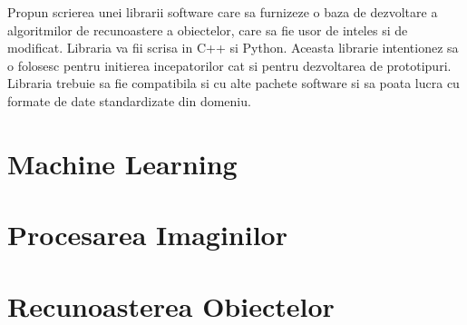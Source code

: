 \documentclass[12pt,a4paper]{article}
\begin{document}
Propun scrierea unei librarii software care sa furnizeze o baza de dezvoltare a algoritmilor de recunoastere a obiectelor,
care sa fie usor de inteles si de modificat. 
Libraria va fii scrisa in C++ si Python. 
Aceasta librarie intentionez sa o folosesc pentru initierea incepatorilor cat si pentru dezvoltarea de prototipuri.
Libraria trebuie sa fie compatibila si cu alte pachete software si sa poata lucra cu formate de date standardizate din domeniu.



\section{Machine Learning}

\section{Procesarea Imaginilor}

\section{Recunoasterea Obiectelor}
\end{document}
